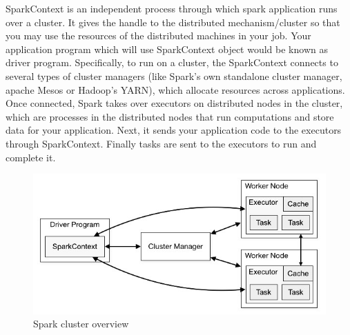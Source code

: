 SparkContext is an independent process through which spark application runs over a cluster. It gives the handle to the distributed mechanism/cluster so that you may use the resources of the distributed machines in your job. Your application program which will use SparkContext object would be known as driver program. Specifically, to run on a cluster, the SparkContext connects to several types of cluster managers (like Spark’s own standalone cluster manager, apache Mesos or Hadoop's YARN), which allocate resources across applications. Once connected, Spark takes over executors on distributed nodes in the cluster, which are processes in the distributed nodes that run computations and store data for your application. Next, it sends your application code to the executors through SparkContext. Finally tasks are sent to the executors to run and complete it.
\\
\begin{figure}[h]
	\centering \includegraphics[scale=1]{input/images/spark1.jpg}
	\caption{Spark cluster overview}
	
\end{figure}


